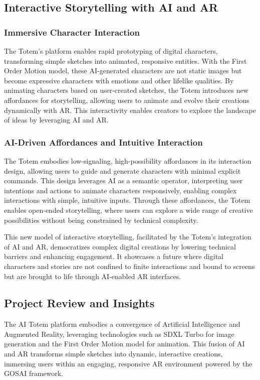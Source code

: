 \subsection{Interactive Storytelling with AI and AR}
\subsubsection{Immersive Character Interaction}
The Totem’s platform enables rapid prototyping of digital characters, transforming simple sketches into animated, responsive entities.
With the First Order Motion model, these AI-generated characters are not static images but become expressive characters with emotions and other lifelike qualities.
By animating characters based on user-created sketches, the Totem introduces new affordances for storytelling, allowing users to animate and evolve their creations dynamically with AR.
This interactivity enables creators to explore the landscape of ideas by leveraging AI and AR.

\subsubsection{AI-Driven Affordances and Intuitive Interaction}
The Totem embodies low-signaling, high-possibility affordances in its interaction design, allowing users to guide and generate characters with minimal explicit commands.
This design leverages AI as a semantic operator, interpreting user intentions and actions to animate characters responsively, enabling complex interactions with simple, intuitive inputs.
Through these affordances, the Totem enables open-ended storytelling, where users can explore a wide range of creative possibilities without being constrained by technical complexity.

This new model of interactive storytelling, facilitated by the Totem’s integration of AI and AR, democratizes complex digital creations by lowering technical barriers and enhancing engagement.
It showcases a future where digital characters and stories are not confined to finite interactions and bound to screens but are brought to life through AI-enabled AR interfaces.

\subsection{Project Review and Insights}
The AI Totem platform embodies a convergence of Artificial Intelligence and Augmented Reality, leveraging technologies such as SDXL Turbo for image generation and the First Order Motion model for animation.
This fusion of AI and AR transforms simple sketches into dynamic, interactive creations, immersing users within an engaging, responsive AR environment powered by the GOSAI framework.

